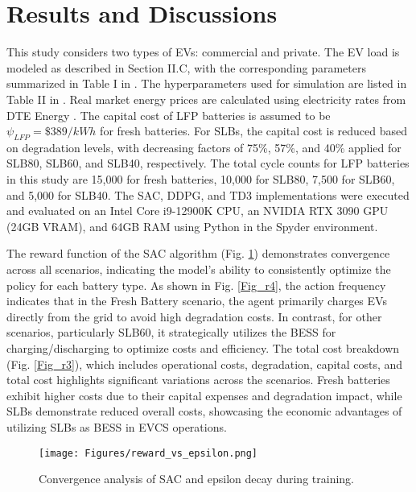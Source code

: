 \documentclass[10pt, journal]{IEEEtran}
\begin{document}
\section{Results and Discussions}
This study considers two types of EVs: commercial and private. The EV load is modeled as described in Section II.C, with the corresponding parameters summarized in Table I in \cite{Github_repository}. The hyperparameters used for simulation are listed in Table II in \cite{Github_repository}. Real market energy prices are calculated using electricity rates from DTE Energy \cite{dte_pricing}. The capital cost of LFP batteries is assumed to be  $\psi_{LFP}=\$389/kWh$ for fresh batteries. For SLBs, the capital cost is reduced based on degradation levels, with decreasing factors of 75\%, 57\%, and 40\% applied for SLB80, SLB60, and SLB40, respectively. The total cycle counts for LFP batteries in this study are 15,000 for fresh batteries, 10,000 for SLB80, 7,500 for SLB60, and 5,000 for SLB40. The SAC, DDPG, and TD3 implementations were executed and evaluated on an Intel Core i9-12900K CPU, an NVIDIA RTX 3090 GPU (24GB VRAM), and 64GB RAM using Python in the Spyder environment.

The reward function of the SAC algorithm (Fig. \ref{Fig_reward}) demonstrates convergence across all scenarios, indicating the model's ability to consistently optimize the policy for each battery type. As shown in Fig. \ref{Fig_r4}, the action frequency indicates that in the Fresh Battery scenario, the agent primarily charges EVs directly from the grid to avoid high degradation costs. In contrast, for other scenarios, particularly SLB60, it strategically utilizes the BESS for charging/discharging to optimize costs and efficiency. The total cost breakdown (Fig. \ref{Fig_r3}), which includes operational costs, degradation, capital costs, and total cost highlights significant variations across the scenarios. Fresh batteries exhibit higher costs due to their capital expenses and degradation impact, while SLBs demonstrate reduced overall costs, showcasing the economic advantages of utilizing SLBs as BESS in EVCS operations.
\vspace{-4mm}

{\setlength{\belowcaptionskip}{-8mm}
\begin{figure}[ht]
\centering
\texttt{[image: Figures/reward\_vs\_epsilon.png]}
\caption{Convergence analysis of SAC and epsilon decay during training.}
\label{Fig_reward}
\end{figure}}
\end{document}
